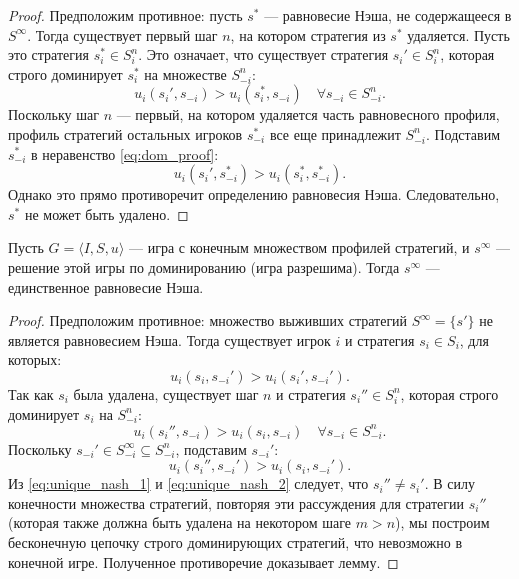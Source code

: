 \begin{proof}
Предположим противное: пусть $s^*$ — равновесие Нэша, не содержащееся в $S^\infty$. Тогда существует первый шаг $n$, на котором стратегия из $s^*$ удаляется. Пусть это стратегия $s_i^* \in S_i^n$. Это означает, что существует стратегия $s_i' \in S_i^n$, которая строго доминирует $s_i^*$ на множестве $S_{-i}^n$:
\begin{equation}\label{eq:dom_proof}
    u_i(s_i', s_{-i}) > u_i(s_i^*, s_{-i}) \quad \forall s_{-i} \in S_{-i}^n.
\end{equation}
Поскольку шаг $n$ — первый, на котором удаляется часть равновесного профиля, профиль стратегий остальных игроков $s_{-i}^*$ все еще принадлежит $S_{-i}^n$. Подставим $s_{-i}^*$ в неравенство \eqref{eq:dom_proof}:
\begin{equation}
    u_i(s_i', s_{-i}^*) > u_i(s_i^*, s_{-i}^*).
\end{equation}
Однако это прямо противоречит определению равновесия Нэша. Следовательно, $s^*$ не может быть удалено.
\end{proof}

\begin{lemma}
Пусть $G = \langle I, S, u \rangle$ — игра с конечным множеством профилей стратегий, и $s^\infty$ — решение этой игры по доминированию (игра разрешима). Тогда $s^\infty$ — единственное равновесие Нэша.
\end{lemma}

\begin{proof}
Предположим противное: множество выживших стратегий $S^\infty = \{s'\}$ не является равновесием Нэша. Тогда существует игрок $i$ и стратегия $s_i \in S_i$, для которых:
\begin{equation}\label{eq:unique_nash_1}
    u_i(s_i, s_{-i}') > u_i(s_i', s_{-i}').
\end{equation}
Так как $s_i$ была удалена, существует шаг $n$ и стратегия $s_i'' \in S_i^n$, которая строго доминирует $s_i$ на $S_{-i}^n$:
\begin{equation}
    u_i(s_i'', s_{-i}) > u_i(s_i, s_{-i}) \quad \forall s_{-i} \in S_{-i}^n.
\end{equation}
Поскольку $s_{-i}' \in S_{-i}^\infty \subseteq S_{-i}^n$, подставим $s_{-i}'$:
\begin{equation}\label{eq:unique_nash_2}
    u_i(s_i'', s_{-i}') > u_i(s_i, s_{-i}').
\end{equation}
Из \eqref{eq:unique_nash_1} и \eqref{eq:unique_nash_2} следует, что $s_i'' \neq s_i'$. В силу конечности множества стратегий, повторяя эти рассуждения для стратегии $s_i''$ (которая также должна быть удалена на некотором шаге $m > n$), мы построим бесконечную цепочку строго доминирующих стратегий, что невозможно в конечной игре. Полученное противоречие доказывает лемму.
\end{proof}

